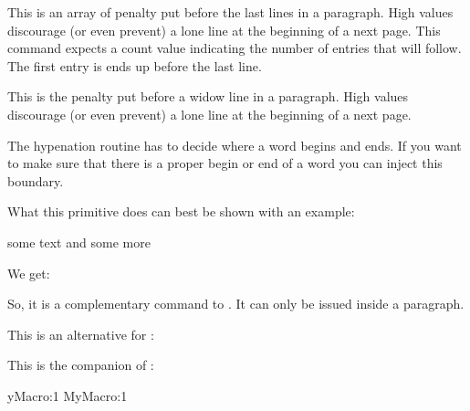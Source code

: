\stopoldprimitive

\startoldprimitive[title={\prm {widowpenalties}}]

This is an array of penalty put before the last lines in a paragraph. High values
discourage (or even prevent) a lone line at the beginning of a next page. This
command expects a count value indicating the number of entries that will follow.
The first entry is ends up before the last line.

\stopoldprimitive

\startoldprimitive[title={\prm {widowpenalty}}]

This is the penalty put before a widow line in a paragraph. High values
discourage (or even prevent) a lone line at the beginning of a next page.

\stopoldprimitive

\startnewprimitive[title={\prm {wordboundary}}]

The hypenation routine has to decide where a word begins and ends. If you want to
make sure that there is a proper begin or end of a word you can inject this
boundary.

\stopnewprimitive

\startnewprimitive[title={\prm {wrapuppar}}]

What this primitive does can best be shown with an example:

\startbuffer
some text and some more
\stopbuffer

\typebuffer

We get:

\blank \getbuffer \blank

So, it is a complementary command to . It can only be issued
inside a paragraph.

\stopnewprimitive

\startoldprimitive[title={\prm {xdef}}]

This is an alternative for \type {\global \edef}:

\starttyping
\xdef\MyMacro{...}
\stoptyping

\stopoldprimitive

\startnewprimitive[title={\prm {xdefcsname}}]

This is the companion of :

\starttyping
\expandafter\xdef\csname MyMacro:1
             \xdefcsname MyMacro:1
\stoptyping

\stopnewprimitive


